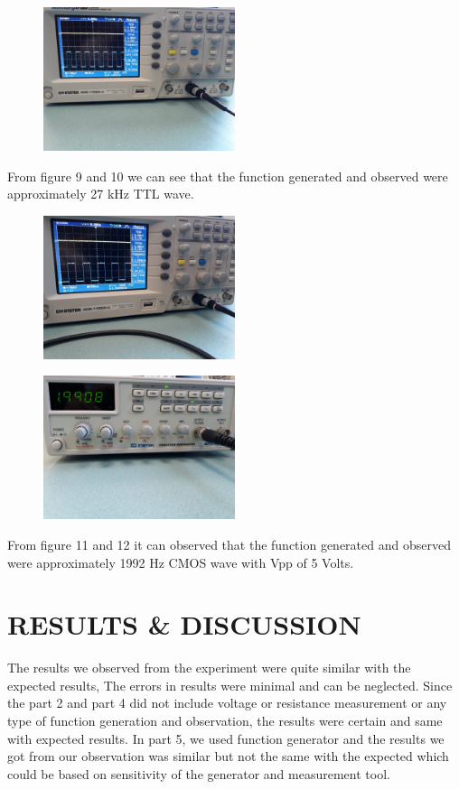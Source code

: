 \documentclass[pdftex,12pt,a4paper]{article}
\begin{document}
\begin{figure}[h]
	\centering
	\includegraphics[width=0.5\textwidth]{10.jpg}
	\caption
	\label{Figure 10}
\end{figure}
From figure 9 and 10 we can see that the function generated and observed were approximately 27 kHz TTL wave.

\clearpage
\begin{figure}[h]
	\centering
	\includegraphics[width=0.5\textwidth]{11.jpg}
	\caption
	\label{Figure 11}
\end{figure}

\begin{figure}[h]
	\centering
	\includegraphics[width=0.5\textwidth]{12.jpg}
	\caption
	\label{Figure 12}
\end{figure}
From figure 11 and 12 it can observed that the function generated and observed were approximately 1992 Hz CMOS wave with Vpp of 5 Volts.

\clearpage
\section{RESULTS \& DISCUSSION}
The results we observed from the experiment were quite similar with the expected results, The errors in results were minimal and can be neglected. Since the part 2 and part 4 did not include voltage or resistance measurement or any type of function generation and observation, the results were certain and same with expected results. In part 5, we used function generator and the results we got from our observation was similar but not the same with the expected which could be based on sensitivity of the generator and measurement tool.
\end{document}
